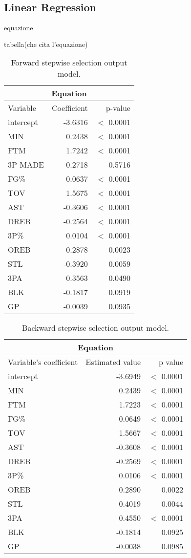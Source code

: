 \subsection*{Linear Regression}\label{appendix:lr}
equazione

tabella(che cita l'equazione)
\begin{table}[H]
	\centering
	\begin{tabular}{|| l | r | r ||} 
		\hline
		\multicolumn{3}{|c|}{Equation} \\
		\hline
		Variable & Coefficient & p-value \\
		\hline
		intercept & -3.6316 & $<$ 0.0001 \\
		MIN & 0.2438 & $<$ 0.0001 \\
		FTM & 1.7242 & $<$ 0.0001 \\
		3P MADE & 0.2718 & 0.5716 \\
		FG\% & 0.0637 & $<$ 0.0001 \\
		TOV & 1.5675 & $<$ 0.0001 \\
		AST & -0.3606 & $<$ 0.0001 \\
		DREB & -0.2564 & $<$ 0.0001 \\
		3P\% & 0.0104 & $<$ 0.0001 \\
		OREB & 0.2878 & 0.0023 \\
		STL & -0.3920 & 0.0059 \\
		3PA & 0.3563 & 0.0490 \\
		BLK & -0.1817 & 0.0919 \\
		GP & -0.0039 & 0.0935 \\
		\hline
	\end{tabular}
	\caption{Forward stepwise selection output model.}
	\label{table:ForwardModelSummary}
\end{table}


\begin{table}[H]
	\centering
	\begin{tabular}{|| l | r | r ||} 
		\hline
		\multicolumn{3}{|c|}{Equation} \\
		\hline
		Variable's coefficient & Estimated value & p value \\
		\hline
		intercept & -3.6949 & $<$ 0.0001 \\
		MIN & 0.2439 & $<$ 0.0001 \\
		FTM & 1.7223 & $<$ 0.0001 \\
		FG\% & 0.0649 & $<$ 0.0001 \\
		TOV & 1.5667 & $<$ 0.0001 \\
		AST & -0.3608 & $<$ 0.0001 \\
		DREB & -0.2569 & $<$ 0.0001 \\
		3P\% & 0.0106 & $<$ 0.0001 \\
		OREB & 0.2890 & 0.0022 \\
		STL & -0.4019 & 0.0044 \\
		3PA & 0.4550 & $<$ 0.0001 \\
		BLK & -0.1814 & 0.0925 \\
		GP & -0.0038 & 0.0985 \\
		\hline
	\end{tabular}
	\caption{Backward stepwise selection output model.}
	\label{table:BackwardModelSummary}
\end{table}